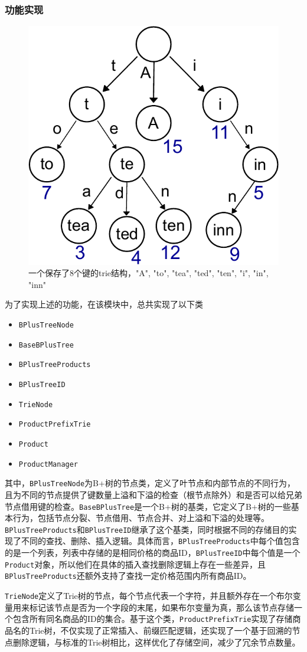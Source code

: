 \documentclass[cn,hazy,blue,10pt,normal]{elegantnote}
\begin{document}
\subsubsection{功能实现}
\begin{figure}[t]
    \begin{center}
    \centerline{\includegraphics[width=0.4\columnwidth]{image/Trie_example-crop.pdf}}
    \caption{一个保存了8个键的trie结构，"A", "to", "tea", "ted", "ten", "i", "in", "inn"}
    \label{fig: trie example}
    \end{center}
\end{figure}
为了实现上述的功能，在该模块中，总共实现了以下类
\begin{itemize}
    \item \texttt{BPlusTreeNode}
    \item \texttt{BaseBPlusTree}
    \item \texttt{BPlusTreeProducts}
    \item \texttt{BPlusTreeID}
    \item \texttt{TrieNode}
    \item \texttt{ProductPrefixTrie}
    \item \texttt{Product}
    \item \texttt{ProductManager}
\end{itemize}
其中，\texttt{BPlusTreeNode}为B+树的节点类，定义了叶节点和内部节点的不同行为，且为不同的节点提供了键数量上溢和下溢的检查（根节点除外）和是否可以给兄弟节点借用键的检查。\texttt{BaseBPlusTree}是一个B+树的基类，它定义了B+树的一些基本行为，包括节点分裂、节点借用、节点合并、对上溢和下溢的处理等。\texttt{BPlusTreeProducts}和\texttt{BPlusTreeID}继承了这个基类，同时根据不同的存储目的实现了不同的查找、删除、插入逻辑。具体而言，\texttt{BPlusTreeProducts}中每个值包含的是一个列表，列表中存储的是相同价格的商品ID，\texttt{BPlusTreeID}中每个值是一个\texttt{Product}对象，所以他们在具体的插入查找删除逻辑上存在一些差异，且\texttt{BPlusTreeProducts}还额外支持了查找一定价格范围内所有商品ID。

\texttt{TrieNode}定义了Trie树的节点，每个节点代表一个字符，并且额外存在一个布尔变量用来标记该节点是否为一个字段的末尾，如果布尔变量为真，那么该节点存储一个包含所有同名商品的ID的集合。基于这个类，\texttt{ProductPrefixTrie}实现了存储商品名的Trie树，不仅实现了正常插入、前缀匹配逻辑，还实现了一个基于回溯的节点删除逻辑，与标准的Trie树相比，这样优化了存储空间，减少了冗余节点数量。
\end{document}
